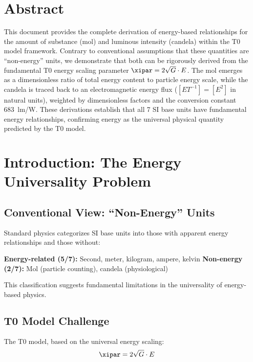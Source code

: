 \section*{Abstract}
		This document provides the complete derivation of energy-based relationships for the amount of substance (mol) and luminous intensity (candela) within the T0 model framework. Contrary to conventional assumptions that these quantities are ``non-energy'' units, we demonstrate that both can be rigorously derived from the fundamental T0 energy scaling parameter $\xipar = 2\sqrt{G} \cdot E$. The mol emerges as a dimensionless ratio of total energy content to particle energy scale, while the candela is traced back to an electromagnetic energy flux ($[E T^{-1}] = [E^2]$ in natural units), weighted by dimensionless factors and the conversion constant 683~lm/W. These derivations establish that all 7 SI base units have fundamental energy relationships, confirming energy as the universal physical quantity predicted by the T0 model.

	

	\section{Introduction: The Energy Universality Problem}
	\label{sec:introduction}
	
	\subsection{Conventional View: ``Non-Energy'' Units}
	\label{subsec:conventional_view}
	
	Standard physics categorizes SI base units into those with apparent energy relationships and those without:
	
	\textbf{Energy-related (5/7):} Second, meter, kilogram, ampere, kelvin
	\textbf{Non-energy (2/7):} Mol (particle counting), candela (physiological)
	
	This classification suggests fundamental limitations in the universality of energy-based physics.
	
	\subsection{T0 Model Challenge}
	\label{subsec:t0_challenge}
	
	The T0 model, based on the universal energy scaling:
	\begin{equation}
		\xipar = 2\sqrt{G} \cdot E
		\label{eq:t0_fundamental}
	\end{equation}
	
